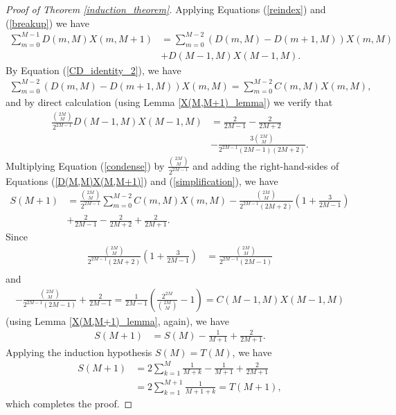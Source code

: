 \documentclass{amsart}
\theoremstyle{plain}
\theoremstyle{remark}
\begin{document}
\begin{proof}[Proof of Theorem \ref{induction_theorem}]
Applying Equations (\ref{reindex}) and (\ref{breakup}) we have
\begin{align*}
\sum_{m=0}^{M-1} D(m,M)X(m,M+1) &= \sum_{m=0}^{M-2}\left(D(m,M) - D(m+1,M)\right)X(m,M) \\
& + D(M-1,M)X(M-1,M).
\end{align*}
By Equation (\ref{CD_identity_2}), we have 
\begin{align} \label{condense}
\sum_{m=0}^{M-2}\left(D(m,M) - D(m+1,M)\right)X(m,M) = \sum_{m=0}^{M-2}C(m,M)X(m,M),
\end{align}
and by direct calculation (using Lemma \ref{X(M,M+1)_lemma}) we verify that 
\begin{align} \label{simplification}
\frac{\binom{2M}{M}}{2^{2M-1}}D(M-1,M)X(M-1,M) &= \frac{2}{2M-1} - \frac{2}{2M+2} \\
&- \frac{3\binom{2M}{M}}{2^{2M-1}(2M-1)(2M+2)}. \nonumber
\end{align}
Multiplying Equation (\ref{condense}) by $\frac{\binom{2M}{M}}{2^{2M-1}}$ and adding the right-hand-sides of Equations (\ref{D(M,M)X(M,M+1)}) and  (\ref{simplification}), we have
\begin{align*}
S(M+1) &= \frac{\binom{2M}{M}}{2^{2M-1}} \sum_{m=0}^{M-2}C(m,M)X(m,M)  - \frac{\binom{2M}{M}}{2^{2M-1}(2M+2)}\left(1 + \frac{3}{2M-1} \right) \\&+\frac{2}{2M-1} - \frac{2}{2M+2} + \frac{2}{2M+1}.
\end{align*}
Since 
\begin{align*}
\frac{\binom{2M}{M}}{2^{2M-1}(2M+2)}\left(1 + \frac{3}{2M-1} \right) &= \frac{\binom{2M}{M}}{2^{2M-1}(2M-1)}\\
\end{align*}
and
\begin{align*}
-\frac{\binom{2M}{M}}{2^{2M-1}(2M-1)} + \frac{2}{2M-1} = \frac{1}{2M-1} \left(\frac{2^{2M}}{\binom{2M}{M}} -1 \right) = C(M-1,M)X(M-1,M) 
\end{align*}
(using Lemma \ref{X(M,M+1)_lemma}, again), we have
\begin{align*}
S(M+1) &= S(M)  - \frac{1}{M+1} + \frac{2}{2M+1}.
\end{align*}
Applying the induction hypothesis $S(M) = T(M)$, we have
\begin{align*}
S(M+1) &= 2 \sum_{k=1}^M \frac{1}{M+k} - \frac{1}{M+1} + \frac{2}{2M+1} \\
&=2\sum_{k=1}^{M+1} \frac{1}{M+1+k} = T(M+1),
\end{align*}
which completes the proof.
\end{proof}
\end{document}

